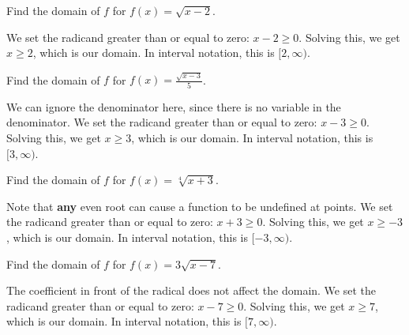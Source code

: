 \documentclass{ximera}
\begin{document}
\begin{example}
	Find the domain of $f$ for $f(x) = \sqrt{x - 2}$.
		\begin{explanation}
			\begin{expandable}

We set the radicand greater than or equal to zero: $x - 2 \ge 0$. Solving this, we get $x \ge 2$, which is our domain. In interval notation, this is $[2, \infty)$. 
			\end{expandable}
		\end{explanation}
\end{example}
\begin{example}
	Find the domain of $f$ for $f(x) = \frac{\sqrt{x - 3}}{5}$.
		\begin{explanation}
			\begin{expandable}

We can ignore the denominator here, since there is no variable in the denominator. We set the radicand greater than or equal to zero: $x - 3 \ge 0$. Solving this, we get $x \ge 3$, which is our domain. In interval notation, this is $[3, \infty)$. 
			\end{expandable}
		\end{explanation}
\end{example}
\begin{example}
	Find the domain of $f$ for $f(x) = \sqrt[4]{x + 3}$.
		\begin{explanation}
			\begin{expandable}

Note that \textbf{any} even root can cause a function to be undefined at points. We set the radicand greater than or equal to zero: $x + 3 \ge 0$. Solving this, we get $x \ge -3$, which is our domain. In interval notation, this is $[-3, \infty)$.  
			\end{expandable}
		\end{explanation}
\end{example}
\begin{example}
	Find the domain of $f$ for $f(x) = 3\sqrt{x - 7}$.
		\begin{explanation}
			\begin{expandable}

The coefficient in front of the radical does not affect the domain. We set the radicand greater than or equal to zero: $x -7 \ge 0$. Solving this, we get $x \ge 7$, which is our domain. In interval notation, this is $[7, \infty)$. 
			\end{expandable}
		\end{explanation}
\end{example}
\end{document}
